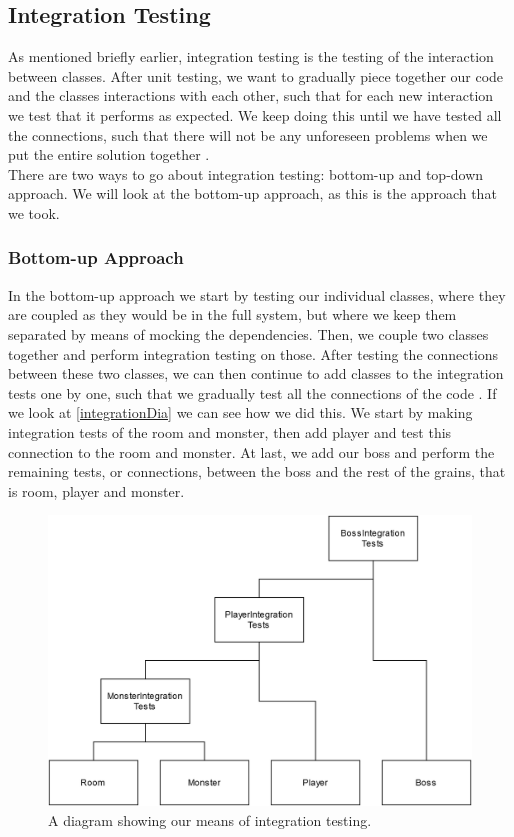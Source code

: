 \subsection{Integration Testing}
As mentioned briefly earlier, integration testing is the testing of the interaction between classes. After unit testing, we want to gradually piece together our code and the classes interactions with each other, such that for each new interaction we test that it performs as expected. We keep doing this until we have tested all the connections, such that there will not be any unforeseen problems when we put the entire solution together \cite{TestingBlackbox}. \\
There are two ways to go about integration testing: bottom-up and top-down approach. We will look at the bottom-up approach, as this is the approach that we took. 
\subsubsection{Bottom-up Approach}
In the bottom-up approach we start by testing our individual classes, where they are coupled as they would be in the full system, but where we keep them separated by means of mocking the dependencies. Then, we couple two classes together and perform integration testing on those. After testing the connections between these two classes, we can then continue to add classes to the integration tests one by one, such that we gradually test all the connections of the code \cite{TestingBlackbox}. If we look at \autoref{integrationDia} we can see how we did this. We start by making integration tests of the room and monster, then add player and test this connection to the room and monster. At last, we add our boss and perform the remaining tests, or connections, between the boss and the rest of the grains, that is room, player and monster.
\begin{figure}
    \centering
    \includegraphics[width=0.7\linewidth]{Materials/TestingTheory/IntegrationDiagram}
    \caption{A diagram showing our means of integration testing.}
    \label{integrationDia}
\end{figure}
